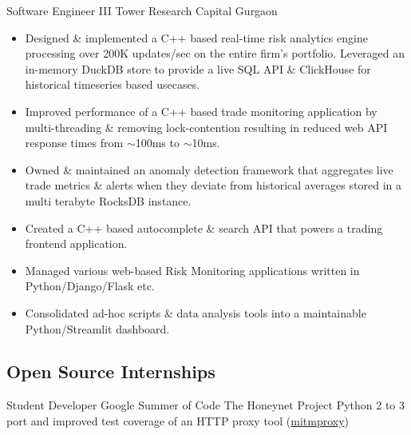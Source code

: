     {Software Engineer III}
    {Tower Research Capital}
    {Gurgaon}
    {}
    {
        \begin{itemize}
            \item Designed \& implemented a C++ based real-time risk analytics engine
            processing over 200K updates/sec on the entire firm's portfolio.
            Leveraged an in-memory DuckDB store to provide a live SQL API \& ClickHouse for historical timeseries based usecases.
            \item Improved performance of a C++ based trade monitoring application by multi-threading \& removing lock-contention resulting in reduced web API response times from $\sim$100ms to $\sim$10ms.
            \item Owned \& maintained an anomaly detection framework that aggregates live trade metrics \& alerts when they deviate from historical averages stored in a multi terabyte RocksDB instance.
            \item Created a C++ based autocomplete \& search API that powers a trading frontend application.
            \item Managed various web-based Risk Monitoring applications written in Python/Django/Flask etc.
            \item Consolidated ad-hoc scripts \& data analysis tools into a maintainable Python/Streamlit dashboard.
        \end{itemize}
    }
    \vspace*{0.2\baselineskip}


\subsection{Open Source Internships}
    \vspace*{0.2\baselineskip}

    {Student Developer}
    {Google Summer of Code}
    {The Honeynet Project}
    {}
    {
        Python 2 to 3 port
        and improved test coverage of an HTTP proxy tool
        (\href{http://github.com/mitmproxy/mitmproxy/}{mitmproxy})
    }
    \vspace*{0.2\baselineskip}

